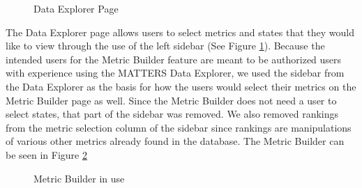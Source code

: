 			\begin{figure}[t]
				\centering
					\caption{Data Explorer Page}
				\label{fig:dataexplorer}
			\end{figure}
			
			The Data Explorer page allows users to select metrics and states that they would like to view through the use of the left sidebar (See Figure \ref{fig:dataexplorer}). 
			Because the intended users for the Metric Builder feature are meant to be authorized users with 
			experience using the MATTERS Data Explorer, we used the sidebar from the Data Explorer as the 
			basis for how the users would select their metrics on the Metric Builder page as well. Since the Metric Builder does not need a user to select states, 
			that part of the sidebar was removed. We also removed rankings from the metric selection column of the sidebar since rankings are manipulations of 
			various other metrics already found in the database. The Metric Builder can be seen in Figure \ref{fig:mb2}
			
				\begin{figure}[t]
					\centering
					\caption{Metric Builder in use}
					\label{fig:mb2}
				\end{figure}
			
